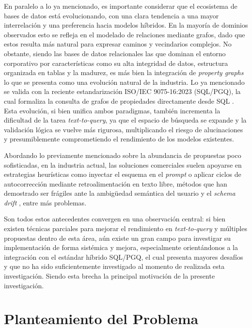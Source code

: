 En paralelo a lo ya mencionado, es importante considerar que el ecosistema de bases de datos está evolucionando, con una clara tendencia a una mayor interrelación y una preferencia hacia modelos híbridos. En la mayoría de dominios observados esto se refleja en el modelado de relaciones mediante grafos, dado que estos resulta más natural para expresar caminos y vecindarios complejos. No obstante, siendo las bases de datos relacionales las que dominan el entorno corporativo por características como su alta integridad de datos, estructura organizada en tablas y la madurez, es más bien la integración de \emph{property graphs} lo que se presenta como una evolución natural de la industria. Lo ya mencionado se valida con la reciente estandarización ISO/IEC 9075-16:2023 (\ac{SQL}/\ac{PGQ}), la cual formaliza la consulta de grafos de propiedades directamente desde \ac{SQL} \cite{ISO9075_16_2023}. Esta evolución, si bien unifica ambos paradigmas, también incrementa la dificultad de la tarea \emph{text-to-query}, ya que el espacio de búsqueda se expande y la validación lógica se vuelve más rigurosa, multiplicando el riesgo de alucinaciones y presumiblemente comprometiendo el rendimiento de los modelos existentes.

Abordando lo previamente mencionado sobre la abundancia de propuestas poco sofisticadas, en la industria actual, las soluciones comerciales suelen apoyarse en estrategias heurísticas como inyectar el esquema en el \emph{prompt} o aplicar ciclos de autocorrección mediante retroalimentación en texto libre, métodos que han demostrado ser frágiles ante la ambigüedad semántica del usuario y el \emph{schema drift} \cite{AmbiSQL}, entre más problemas.

Son todos estos antecedentes convergen en una observación central: si bien existen técnicas parciales para mejorar el rendimiento en \emph{text-to-query} y múltiples propuestas dentro de esta área, aún existe un gran campo para investigar su implementación de forma sistémica y mejora, especialmente orientándonos a la integración con el estándar híbrido \ac{SQL}/\ac{PGQ}, el cual presenta mayores desafíos y que no ha sido suficientemente investigado al momento de realizada esta investigación. Siendo esta brecha la principal motivación de la presente investigación.


\section{Planteamiento del Problema}

